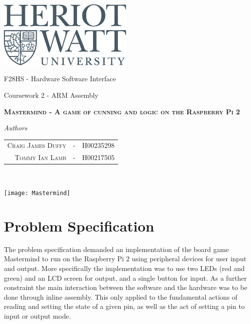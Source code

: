 \documentclass[a4paper, titlepage]{article}
\begin{document}
	\begin{titlepage}
		\thispagestyle{empty}
		{\centering
			\includegraphics[width=0.5\textwidth]{heriot-watt-logo.png}\par\vspace{1cm}
			\vspace{1cm}
			{\LARGE F28HS - Hardware Software Interface\par}
			{\LARGE Coursework 2 - ARM Assembly\par}
			\vspace{1.5cm}
			\vspace{1.5cm}
			{\scshape\LARGE\bfseries Mastermind - A game of cunning and logic on the Raspberry Pi 2 \par}
			\vspace{5cm}
			
			\textit{Authors}\par
			\begin{tabular}{rcl}
				\\ \textsc{Craig James Duffy} & - & H00235298\\
				\textsc{Tommy Ian Lamb} & - & H00217505 \\
			\end{tabular} \\		
		}
	\end{titlepage}
	\pagebreak
	
	\setcounter{tocdepth}{1}
	\tableofcontents
	\vspace{2cm}
	\begin{center}
			\texttt{[image: Mastermind]}
	\end{center}

	\clearpage
	
	
\section{Problem Specification}

The problem specification demanded an implementation of the board game Mastermind to run on the Raspberry Pi 2 using peripheral devices for user input and output. More specifically the implementation was to use two LEDs (red and green) and an LCD screen for output, and a single button for input. As a further constraint the main interaction between the software and the hardware was to be done through inline assembly. This only applied to the fundamental actions of reading and setting the state of a given pin, as well as the act of setting a pin to input or output mode. 
\end{document}
